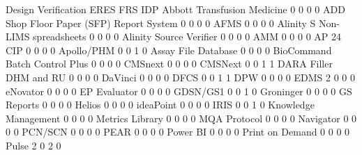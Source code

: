 \documentclass{article}
\begin{document}
\begin{Schunk}
\begin{Soutput}
                                           Design Verification ERES FRS IDP
  Abbott Transfusion Medicine                                0    0   0   0
  ADD Shop Floor Paper (SFP) Report System                   0    0   0   0
  AFMS                                                       0    0   0   0
  Alinity S Non-LIMS spreadsheets                            0    0   0   0
  Alinity Source Verifier                                    0    0   0   0
  AMM                                                        0    0   0   0
  AP 24 CIP                                                  0    0   0   0
  Apollo/PHM                                                 0    0   1   0
  Assay File Database                                        0    0   0   0
  BioCommand Batch Control Plus                              0    0   0   0
  CMSnext                                                    0    0   0   0
  CMSNext                                                    0    0   1   1
  DARA Filler DHM and RU                                     0    0   0   0
  DaVinci                                                    0    0   0   0
  DFCS                                                       0    0   1   1
  DPW                                                        0    0   0   0
  EDMS                                                       2    0   0   0
  eNovator                                                   0    0   0   0
  EP Evaluator                                               0    0   0   0
  GDSN/GS1                                                   0    0   1   0
  Groninger                                                  0    0   0   0
  GS Reports                                                 0    0   0   0
  Helios                                                     0    0   0   0
  ideaPoint                                                  0    0   0   0
  IRIS                                                       0    0   1   0
  Knowledge Management                                       0    0   0   0
  Metrics Library                                            0    0   0   0
  MQA Protocol                                               0    0   0   0
  Navigator                                                  0    0   0   0
  PCN/SCN                                                    0    0   0   0
  PEAR                                                       0    0   0   0
  Power BI                                                   0    0   0   0
  Print on Demand                                            0    0   0   0
  Pulse                                                      2    0   2   0

\end{Soutput}
\end{Schunk}
\end{document}
